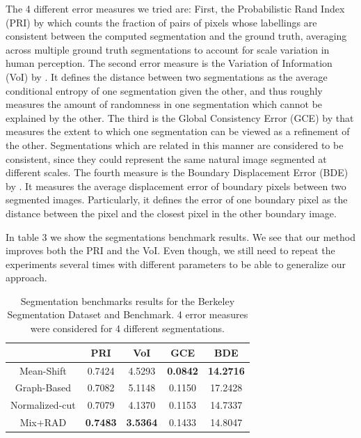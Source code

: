 \documentclass[twoside,11pt]{article}
\begin{document}
The 4 different error measures we tried are: First, the Probabilistic Rand Index
(PRI) by \cite{1099935} which counts the fraction of pairs of pixels whose labellings are
consistent between the computed segmentation and the ground truth, averaging across
multiple ground truth segmentations to account for scale variation in human perception.
The second error measure is the Variation of Information (VoI) by \cite{citeulike:3906686}.
It defines the distance between two segmentations as the average conditional entropy
of one segmentation given the other, and thus roughly measures the amount of randomness
in one segmentation which cannot be explained by the other.
The third is the Global Consistency Error (GCE) by \cite{MartinFTM01} that measures the
extent to which one segmentation can be viewed as a refinement of the other. Segmentations
which are related in this manner are considered to be consistent, since they could represent
the same natural image segmented at different scales.
The fourth measure is the Boundary Displacement Error (BDE) by \cite{649319}. It measures
the average displacement error of boundary pixels between two segmented images. Particularly,
it defines the error of one boundary pixel as the distance between the pixel and the
closest pixel in the other boundary image.

In table 3 we show the segmentations benchmark results. We see that our method improves
both the PRI and the VoI. Even though, we still need to repeat the experiments several times
with different parameters to be able to generalize our approach.

\begin{table}
\centering
\begin{tabular}
{|c||c|c|c|c|}
\hline
               & PRI             & VoI             & GCE             & BDE              \\\hline
Mean-Shift     & 0.7424          & 4.5293          & \textbf{0.0842} & \textbf{14.2716} \\\hline
Graph-Based    & 0.7082          & 5.1148          & 0.1150          & 17.2428          \\\hline
Normalized-cut & 0.7079          & 4.1370          & 0.1153          & 14.7337          \\\hline
Mix+RAD        & \textbf{0.7483} & \textbf{3.5364} & 0.1433          & 14.8047          \\\hline
\end{tabular}
\label{tab:seg_bench}
\caption{Segmentation benchmarks results for the Berkeley Segmentation Dataset and
Benchmark. 4 error measures were considered for 4 different segmentations.}
\end{table}
\end{document}
